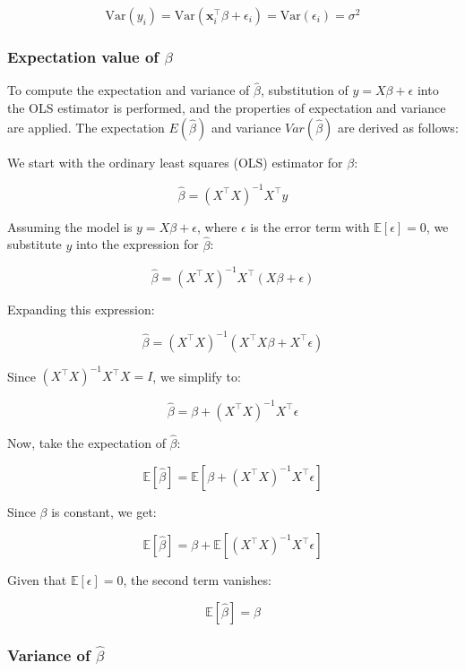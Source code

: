 \documentclass{article}
\begin{document}
\[
\text{Var}(y_i) = \text{Var}(\mathbf{x}_i^\top \beta + \epsilon_i) = \text{Var}(\epsilon_i) = \sigma^2
\]
\newline

\subsubsection{Expectation value of \(\hat{\beta}\)}

To compute the expectation and variance of \( \hat{\beta} \), substitution of \( y = X\beta + \epsilon \) into the OLS estimator is performed, and the properties of expectation and variance are applied. The expectation \( E(\hat{\beta}) \) and variance \( Var(\hat{\beta}) \)  are derived as follows:
\newline

We start with the ordinary least squares (OLS) estimator for \(\beta\):

\[
\hat{\beta} = (X^\top X)^{-1} X^\top y
\]

Assuming the model is \( y = X\beta + \epsilon \), where \(\epsilon\) is the error term with \(\mathbb{E}[\epsilon] = 0\), we substitute \( y \) into the expression for \(\hat{\beta}\):

\[
\hat{\beta} = (X^\top X)^{-1} X^\top (X\beta + \epsilon)
\]

Expanding this expression:

\[
\hat{\beta} = (X^\top X)^{-1} (X^\top X \beta + X^\top \epsilon)
\]

Since \( (X^\top X)^{-1} X^\top X = I \), we simplify to:

\[
\hat{\beta} = \beta + (X^\top X)^{-1} X^\top \epsilon
\]

Now, take the expectation of \(\hat{\beta}\):

\[
\mathbb{E}[\hat{\beta}] = \mathbb{E}\left[\beta + (X^\top X)^{-1} X^\top \epsilon\right]
\]

Since \(\beta\) is constant, we get:

\[
\mathbb{E}[\hat{\beta}] = \beta + \mathbb{E}\left[(X^\top X)^{-1} X^\top \epsilon\right]
\]

Given that \(\mathbb{E}[\epsilon] = 0\), the second term vanishes:

\[
\mathbb{E}[\hat{\beta}] = \beta
\]
\newline





\subsubsection{Variance of \(\hat{\beta}\)}
\end{document}
